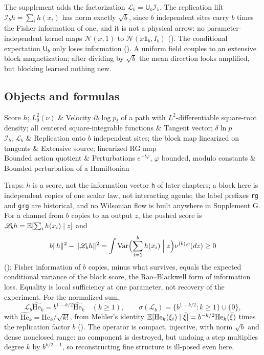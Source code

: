 The supplement adds the factorization \(\mathscr L_b=\mathsf U_b\mathscr I_b\). The replication lift
\(\mathscr I_bh=\sum_ih(x_i)\) has norm exactly \(\sqrt b\), since \(b\) independent sites carry \(b\) times the Fisher
information of one, and it is not a physical arrow: no parameter-independent kernel maps \(\mathcal N(x,1)\) to
\(\mathcal N(x\mathbf 1_b,I_b)\) (). The conditional expectation \(\mathsf U_b\) only
loses information (). A uniform field couples to an extensive block
magnetization; after dividing by \(\sqrt b\) the mean direction looks amplified, but blocking learned nothing new.

\subsection{Objects and formulas}

\begin{decoder}
Score \(h\); \(L^2_0(\nu)\) & Velocity \(\partial_t\log p_t\) of a path with \(L^2\)-differentiable square-root density; all centered square-integrable functions & Tangent vector; \(\delta\ln p\)\\
\(\mathscr I_b\); \(\mathscr L_b\) & Replication onto \(b\) independent sites; the block map linearized on tangents & Extensive source; linearized RG map\\
Bounded action quotient & Perturbations \(e^{-t\varphi}\), \(\varphi\) bounded, modulo constants & Bounded perturbation of a Hamiltonian\\
\end{decoder}

Traps: \(h\) is a score, not the information vector \(\mathsf h\) of later chapters; a block here is independent
copies of one scalar law, not interacting agents; the label prefixes \texttt{rg} and \texttt{grg} are historical,
and no Wilsonian flow is built anywhere in Supplement G. For a channel from \(b\) copies to an output \(z\), the
pushed score is \(\mathscr L_bh=\mathbb E[\sum_ih(x_i)\mid z]\) and
\[
b\lVert h\rVert^2-\lVert\mathscr L_bh\rVert^2
=\int\operatorname{Var}\Bigl(\sum_{i=1}^bh(x_i)\Bigm| z\Bigr)\nu^{(b),c}(dz)\geq0
\]
(): Fisher information of \(b\) copies, minus what survives, equals the
expected conditional variance of the block score, the Rao--Blackwell form of information loss. Equality is
local sufficiency at one parameter, not recovery of the experiment. For the normalized sum,
\[
\mathscr L_b\widehat{\mathrm{He}}_k=b^{1-k/2}\widehat{\mathrm{He}}_k\quad(k\geq1),
\qquad
\sigma(\mathscr L_b)=\{b^{1-k/2}:k\geq1\}\cup\{0\},
\]
with \(\widehat{\mathrm{He}}_k=\mathrm{He}_k/\sqrt{k!}\), from Mehler's identity
\(\mathbb E[\mathrm{He}_k(\xi_i)\mid\bar\xi]=b^{-k/2}\mathrm{He}_k(\bar\xi)\) times the replication factor \(b\)
(). The operator is compact, injective, with norm \(\sqrt b\) and dense
nonclosed range: no component is destroyed, but undoing a step multiplies degree \(k\) by \(b^{k/2-1}\), so
reconstructing fine structure is ill-posed even here.

